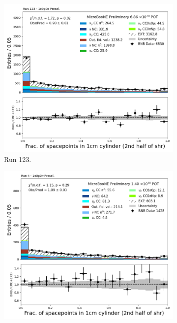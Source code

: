 \begin{figure}[H]
    \centering
    \begin{subfigure}[t]{0.32\linewidth}
        \includegraphics[width=\linewidth]{technote/Appendix_Preselection/Figures/1e0p0pi/Run123/CylFrac2h_1cm_Run123_1e0p0pi_Presel.png}
        \caption{Run 123.}
    \end{subfigure}%
    \hspace{0.2cm}%
    \begin{subfigure}[t]{0.32\linewidth}
        \includegraphics[width=\linewidth]{technote/Appendix_Preselection/Figures/1e0p0pi/Run4b/CylFrac2h_1cm_Run4b_1e0p0pi_Presel.png}

\end{subfigure}
\end{figure}
